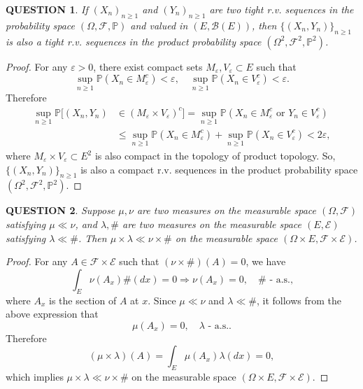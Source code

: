 \documentclass[12pt]{article}
\renewcommand{\b}{\mathscr{B}}
\renewcommand{\(}{\left(}%
\renewcommand{\)}{\right)}%
\renewcommand{\[}{\left[}%
\renewcommand{\]}{\right]}%
\newcommand{\p}{\mathbb{P}}
\newcommand{\f}{\mathscr{F}}
\newcommand{\e}{\mathscr{E}}
\newtheorem{question}{QUESTION}[section]}
\newtheorem{proof}{Proof.}}
\begin{document}
	\begin{question}
		If $(X_n)_{n\geq 1}$ and $(Y_n)_{n\geq 1}$ are two tight r.v. sequences in the probability space $(\Omega,\f,\p)$ and valued in $(E,\b(E))$, then $\{(X_n,Y_n)\}_{n\geq 1}$ is also a tight r.v. sequences in the product probability space $(\Omega^2,\f^2,\p^2)$.
	\end{question}
	\begin{proof}
		For any $\varepsilon>0$, there exist compact sets $M_\varepsilon,V_\varepsilon\subset E$ such that
		\begin{equation*}
			\sup_{n\geq 1}\p(X_n\in M_\varepsilon^c)<\varepsilon,\quad \sup_{n\geq 1}\p(X_n\in V_\varepsilon^c)<\varepsilon.
		\end{equation*}
		Therefore
		\begin{equation*}
			\begin{split}
				\sup_{n\geq 1}\p[(X_n,Y_n)&\in (M_\varepsilon\times V_\varepsilon) ^c]=\sup_{n\geq 1}\p(X_n\in M_\varepsilon^c \text{ or }Y_n\in V_\varepsilon^c)\\
				&\leq \sup_{n\geq 1}\p(X_n\in M_\varepsilon^c)+\sup_{n\geq 1}\p(X_n\in V_\varepsilon^c)<2\varepsilon,
			\end{split}
		\end{equation*}
		where $M_\varepsilon\times V_\varepsilon\subset E^2$ is also compact in the topology of product topology. So, $\{(X_n,Y_n)\}_{n\geq 1}$ is also a compact r.v. sequences in the product probability space $(\Omega^2,\f^2,\p^2)$.
	\end{proof}
	
	\begin{question}
		Suppose $\mu,\nu$ are two measures on the measurable space $(\Omega,\f)$ satisfying $\mu\ll \nu$, and $\lambda,\#$ are two measures on the measurable space $(E,\e)$ satisfying $\lambda\ll \#$. Then $\mu\times\lambda\ll \nu\times\#$ on the measurable space $(\Omega\times E,\f\times \e)$. 
	\end{question}
	\begin{proof}
		For any $A\in \f\times\e$ such that $(\nu\times\#)(A)=0$, we have
		\begin{equation*}
			\int_E\nu(A_x)\#(dx)=0\Longrightarrow \nu(A_x)=0,\quad \#\text{ - a.s.,}
		\end{equation*}
		where $A_x$ is the section of $A$ at $x$. Since $\mu\ll \nu$ and $\lambda\ll \#$, it follows from the above expression that 
		\begin{equation*}
			\mu(A_x)=0,\quad \lambda\text{ - a.s..}
		\end{equation*}
		Therefore
		\begin{equation*}
			(\mu\times\lambda)(A)=\int_E\mu(A_x)\lambda(dx)=0,
		\end{equation*}
		which implies $\mu\times\lambda\ll \nu\times\#$ on the measurable space $(\Omega\times E,\f\times \e)$. 
	\end{proof}
	
\end{document}
